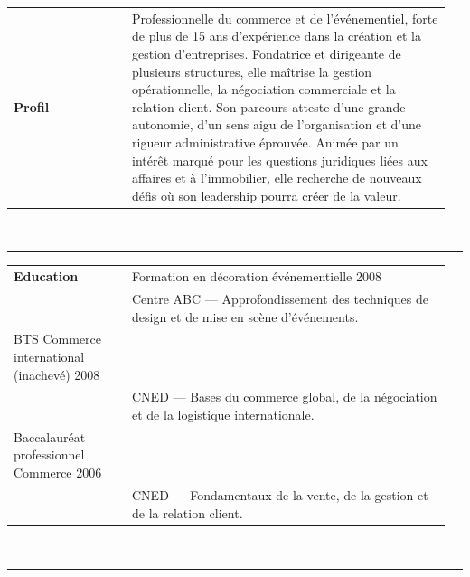\documentclass[a4paper]{article}
\begin{document}
\begin{tabular}{@{}p{0.26\linewidth}p{0.7\linewidth}}
\\
\textbf{\Large Profil} & 
Professionnelle du commerce et de l’événementiel, forte de plus de 15 ans d’expérience dans la création et la gestion d’entreprises. Fondatrice et dirigeante de plusieurs structures, elle maîtrise la gestion opérationnelle, la négociation commerciale et la relation client. Son parcours atteste d’une grande autonomie, d’un sens aigu de l’organisation et d’une rigueur administrative éprouvée. Animée par un intérêt marqué pour les questions juridiques liées aux affaires et à l’immobilier, elle recherche de nouveaux défis où son leadership pourra créer de la valeur.\\
\end{tabular}

~

\rule{\linewidth}{0.05pt}

\begin{tabular}{@{}p{0.26\linewidth}p{0.7\linewidth}}
\\
\textbf{\Large Education} & 
Formation en décoration événementielle \hfill {\small 2008} \\
& Centre ABC — Approfondissement des techniques de design et de mise en scène d’événements. \\[6pt]

BTS Commerce international (inachevé) \hfill {\small 2008} \\
& CNED — Bases du commerce global, de la négociation et de la logistique internationale. \\[6pt]

Baccalauréat professionnel Commerce \hfill {\small 2006} \\
& CNED — Fondamentaux de la vente, de la gestion et de la relation client. \\
\end{tabular}

~

\rule{\linewidth}{0.05pt}
\end{document}
